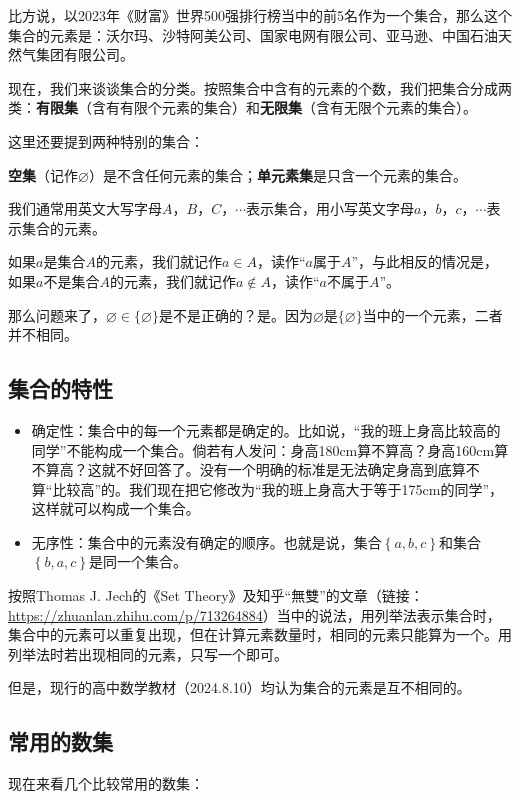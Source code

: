 \documentclass[lang=cn,math=cm,chinesefont=nofont,11pt,scheme=chinese,twocol]{elegantbook}
\begin{document}
比方说，以2023年《财富》世界500强排行榜当中的前5名作为一个集合，那么这个集合的元素是：沃尔玛、沙特阿美公司、国家电网有限公司、亚马逊、中国石油天然气集团有限公司。

现在，我们来谈谈集合的分类。按照集合中含有的元素的个数，我们把集合分成两类：\textbf{有限集}（含有有限个元素的集合）和\textbf{无限集}（含有无限个元素的集合）。

这里还要提到两种特别的集合：

\textbf{空集}（记作$\varnothing$）是不含任何元素的集合；\textbf{单元素集}是只含一个元素的集合。

\hspace*{\fill}

我们通常用英文大写字母$A$，$B$，$C$，$\cdots$表示集合，用小写英文字母$a$，$b$，$c$，$\cdots$表示集合的元素。

如果$a$是集合$A$的元素，我们就记作$a\in A$，读作“$a$属于$A$”，与此相反的情况是，如果$a$不是集合$A$的元素，我们就记作$a\notin A$，读作“$a$不属于$A$”。

那么问题来了，$\varnothing \in \{\varnothing\}$是不是正确的？是。因为$\varnothing$是$\{\varnothing\}$当中的一个元素，二者并不相同。

\subsection{集合的特性}

\begin{itemize}
  \item 确定性：集合中的每一个元素都是确定的。比如说，“我的班上身高比较高的同学”不能构成一个集合。倘若有人发问：身高180cm算不算高？身高160cm算不算高？这就不好回答了。没有一个明确的标准是无法确定身高到底算不算“比较高”的。我们现在把它修改为“我的班上身高大于等于175cm的同学”，这样就可以构成一个集合。
  
  \item 无序性：集合中的元素没有确定的顺序。也就是说，集合$\left\{a,b,c \right\}$和集合$\left\{b,a,c \right\}$是同一个集合。
\end{itemize}

按照Thomas J. Jech的《Set Theory》及知乎“無雙”的文章（链接：\href{https://zhuanlan.zhihu.com/p/713264884}{https://zhuanlan.zhihu.com/p/713264884}）当中的说法，用列举法表示集合时，集合中的元素可以重复出现，但在计算元素数量时，相同的元素只能算为一个。用列举法时若出现相同的元素，只写一个即可。

但是，现行的高中数学教材（2024.8.10）均认为集合的元素是互不相同的。

\subsection{常用的数集}
现在来看几个比较常用的数集：
\end{document}
